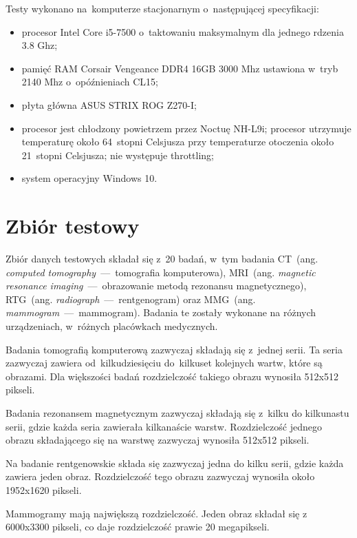 \documentclass[a4paper,11pt,twoside,openright]{report}
\theoremstyle{definition}
\begin{document}
Testy wykonano na~komputerze stacjonarnym o~następującej specyfikacji:
\begin{itemize}[noitemsep]
\item procesor Intel Core i5-7500 o~taktowaniu maksymalnym dla jednego rdzenia 3.8 Ghz;
\item pamięć RAM Corsair Vengeance DDR4 16GB 3000 Mhz ustawiona w~tryb 2140 Mhz o~opóźnieniach CL15;
\item płyta główna ASUS STRIX ROG Z270-I;
\item procesor jest chłodzony powietrzem przez Noctuę NH-L9i; procesor utrzymuje
temperaturę około 64~stopni Celsjusza przy temperaturze otoczenia około 21~stopni
Celsjusza; nie występuje throttling;
\item system operacyjny Windows 10.
\end{itemize}

\section {Zbiór testowy}

Zbiór danych testowych składał się z~20 badań, w~tym badania
CT~(ang. \textit{computed tomography}~---~tomografia komputerowa),
MRI~(ang. \textit{magnetic resonance imaging}~---~obrazowanie metodą rezonansu magnetycznego),
RTG~(ang. \textit{radiograph}~---~rentgenogram) oraz
MMG~(ang. \textit{mammogram}~---~mammogram).
Badania te zostały wykonane na różnych urządzeniach, w~różnych placówkach medycznych.

Badania tomografią komputerową zazwyczaj składają się z~jednej serii. Ta seria zazwyczaj zawiera od~kilkudziesięciu
do~kilkuset kolejnych wartw, które są obrazami. Dla większości badań rozdzielczość takiego obrazu wynosiła 512x512 pikseli.

Badania rezonansem magnetycznym zazwyczaj składają się z~kilku do kilkunastu serii, gdzie każda seria zawierała kilkanaście warstw.
Rozdzielczość jednego obrazu składającego się na warstwę zazwyczaj wynosiła 512x512 pikseli.

Na badanie rentgenowskie składa się zazwyczaj jedna do kilku serii, gdzie każda zawiera jeden obraz. Rozdzielczość tego obrazu zazwyczaj wynosiła około 1952x1620 pikseli.

Mammogramy mają największą rozdzielczość. Jeden obraz składał się z 6000x3300 pikseli, co daje rozdzielczość prawie 20 megapikseli.
\end{document}
